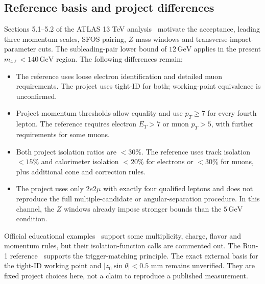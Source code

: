 \documentclass[11pt,a4paper]{article}
\newcommand{\gev}{\,\mathrm{GeV}}
\begin{document}
\subsection{Reference basis and project differences}
Sections 5.1--5.2 of the ATLAS 13 TeV analysis~\cite{ATLAS13} motivate the acceptance, leading three momentum scales, SFOS pairing, $Z$ mass windows and transverse-impact-parameter cuts.
The subleading-pair lower bound of $12\gev$ applies in the present $m_{4\ell}<140\gev$ region.
The following differences remain:
\begin{itemize}[itemsep=1pt,topsep=2pt]
\item The reference uses loose electron identification and detailed muon requirements. The project uses tight-ID for both; working-point equivalence is unconfirmed.
\item Project momentum thresholds allow equality and use $p_T\geq7$ for every fourth lepton. The reference requires electron $E_T>7$ or muon $p_T>5$, with further requirements for some muons.
\item Both project isolation ratios are $<30\%$. The reference uses track isolation $<15\%$ and calorimeter isolation $<20\%$ for electrons or $<30\%$ for muons, plus additional cone and correction rules.
\item The project uses only $2e2\mu$ with exactly four qualified leptons and does not reproduce the full multiple-candidate or angular-separation procedure. In this channel, the $Z$ windows already impose stronger bounds than the $5\gev$ condition.
\end{itemize}
Official educational examples~\cite{HZZCuts,HZZAnalysis} support some multiplicity, charge, flavor and momentum rules, but their isolation-function calls are commented out.
The Run-1 reference~\cite{ATLASRun1} supports the trigger-matching principle.
The exact external basis for the tight-ID working point and $|z_0\sin\theta|<0.5$ mm remains unverified.
They are fixed project choices here, not a claim to reproduce a published measurement.
\end{document}
